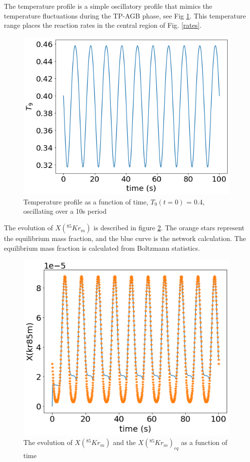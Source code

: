 \documentclass{article}
\begin{document}
The temperature profile is a simple oscillatory profile that mimics the temperature fluctuations during the TP-AGB phase, see Fig 
\ref{temp}. This temperature range places the reaction rates in the central region of Fig. \ref{rates}.
\begin{figure}[H]
    \centerline{\includegraphics[scale = 0.5]{images/temp_profile.png}}
    \caption{Temperature profile as a function of time, $T_{9}(t=0)$ = 0.4, oscillating over a 10s period}
    \label{temp}
\end{figure}

The evolution of $X(^{85}Kr_{m})$ is described in figure \ref{mfrac}. The orange stars represent the equilibrium mass fraction, and 
the blue curve is the network calculation. The equilibrium mass fraction is calculated from Boltzmann statistics. 

\begin{figure}[H]
    \centerline{\includegraphics[scale = 0.5]{images/mass_frac.png}}
    \caption{The evolution of $X(^{85}Kr_{m})$ and the $X(^{85}Kr_{m})_{eq}$ as a function of time}
    \label{mfrac}
\end{figure}
\end{document}

